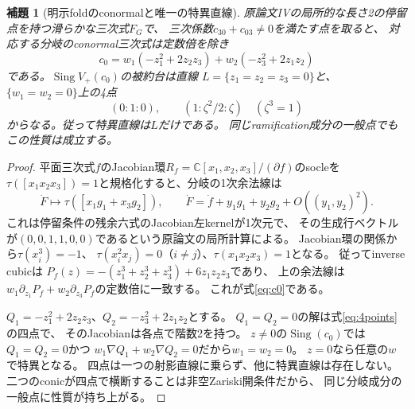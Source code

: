 \documentclass[11pt,a4paper]{ltjsarticle}
\newtheorem{lemma}[theorem]{補題}
\newcommand{\C}{\mathbb C}
\newcommand{\Sing}{\operatorname{Sing}}
\begin{document}
\begin{lemma}[明示foldのconormalと唯一の特異直線]\label{lem:foldconormal}
原論文IVの局所的な長さ2の停留点を持つ滑らかな三次式$F_G$で、
三次係数$c_{30}+c_{03}\ne0$を満たす点を取ると、
対応する分岐のconormal三次式は定数倍を除き
\begin{equation}\label{eq:c0}
 c_0=w_1(-z_1^2+2z_2z_3)+w_2(-z_3^2+2z_1z_2)
\end{equation}
である。$\Sing V_+(c_0)$の被約台は直線
$L=\{z_1=z_2=z_3=0\}$と、$\{w_1=w_2=0\}$上の4点
\begin{equation}\label{eq:4points}
 (0:1:0),\qquad(1:\zeta^2/2:\zeta)\quad(\zeta^3=1)
\end{equation}
からなる。従って特異直線は$L$だけである。
同じramification成分の一般点でもこの性質は成立する。
\end{lemma}
\begin{proof}
平面三次式$f$のJacobian環$R_f=\C[x_1,x_2,x_3]/(\partial f)$のsocleを
$\tau([x_1x_2x_3])=1$と規格化すると、分岐の1次余法線は
\[
 \dot F\longmapsto \tau([x_1g_1+x_3g_2]),\qquad
 \dot F=\dot f+y_1g_1+y_2g_2+O((y_1,y_2)^2).
\]
これは停留条件の残余六式のJacobian左kernelが1次元で、
その生成行ベクトルが$(0,0,1,1,0,0)$であるという原論文の局所計算による。
Jacobian環の関係から$\tau(x_i^3)=-1$、
$\tau(x_i^2x_j)=0$（$i\ne j$）、$\tau(x_1x_2x_3)=1$となる。
従ってinverse cubicは
$P_f(z)=-(z_1^3+z_2^3+z_3^3)+6z_1z_2z_3$であり、
上の余法線は$w_1\partial_{z_1}P_f+w_2\partial_{z_3}P_f$の定数倍に一致する。
これが式\eqref{eq:c0}である。

$Q_1=-z_1^2+2z_2z_3$、$Q_2=-z_3^2+2z_1z_2$とする。
$Q_1=Q_2=0$の解は式\eqref{eq:4points}の四点で、
そのJacobianは各点で階数2を持つ。
$z\ne0$の$\Sing(c_0)$では$Q_1=Q_2=0$かつ
$w_1\nabla Q_1+w_2\nabla Q_2=0$だから$w_1=w_2=0$。
$z=0$なら任意の$w$で特異となる。
四点は一つの射影直線に乗らず、他に特異直線は存在しない。
二つのconicが四点で横断することは非空Zariski開条件だから、
同じ分岐成分の一般点に性質が持ち上がる。
\end{proof}
\end{document}
